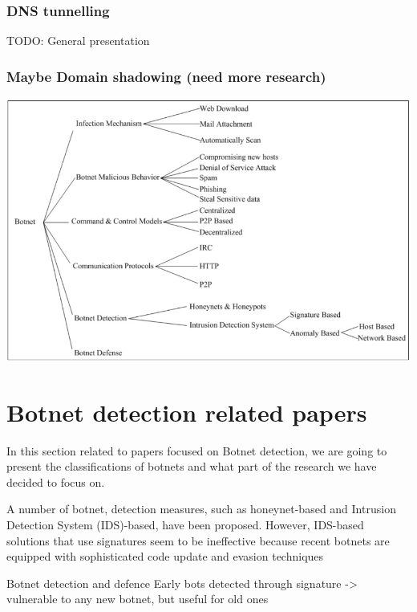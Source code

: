 \subsubsection{DNS tunnelling}
TODO: General presentation
\subsubsection{Maybe Domain shadowing (need more research)}
\includegraphics[scale=.8]{img/botnet_taxonomy.jpg}


\section{Botnet detection related papers}
In this section related to papers focused on Botnet detection, we are going to present the classifications of botnets and what part of the research we have decided to focus on.

A number of botnet, detection measures, such as honeynet-based and Intrusion Detection System (IDS)-based, have been
proposed. However, IDS-based solutions that use signatures seem to be ineffective because recent
botnets are equipped with sophisticated code update and evasion techniques

Botnet detection and defence
Early bots detected through signature 
-> vulnerable to any new botnet, but useful for old ones

